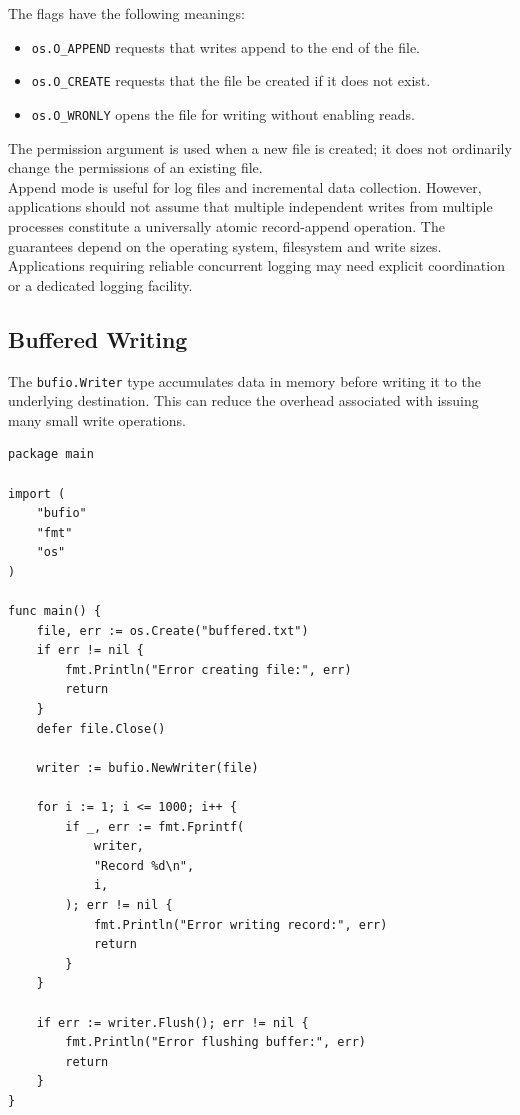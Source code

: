 The flags have the following meanings:

\begin{itemize}
    \item \texttt{os.O\_APPEND} requests that writes append to the end of the file.
    \item \texttt{os.O\_CREATE} requests that the file be created if it does not exist.
    \item \texttt{os.O\_WRONLY} opens the file for writing without enabling reads.
\end{itemize}

The permission argument is used when a new file is created; it does not ordinarily change the permissions of an existing file.\\

Append mode is useful for log files and incremental data collection. However, applications should not assume that multiple independent writes from multiple processes constitute a universally atomic record-append operation. The guarantees depend on the operating system, filesystem and write sizes. Applications requiring reliable concurrent logging may need explicit coordination or a dedicated logging facility.

\subsection{Buffered Writing}

The \texttt{bufio.Writer} type accumulates data in memory before writing it to the underlying destination. This can reduce the overhead associated with issuing many small write operations.

\begin{lstlisting}
package main

import (
    "bufio"
    "fmt"
    "os"
)

func main() {
    file, err := os.Create("buffered.txt")
    if err != nil {
        fmt.Println("Error creating file:", err)
        return
    }
    defer file.Close()

    writer := bufio.NewWriter(file)

    for i := 1; i <= 1000; i++ {
        if _, err := fmt.Fprintf(
            writer,
            "Record %d\n",
            i,
        ); err != nil {
            fmt.Println("Error writing record:", err)
            return
        }
    }

    if err := writer.Flush(); err != nil {
        fmt.Println("Error flushing buffer:", err)
        return
    }
}
\end{lstlisting}


